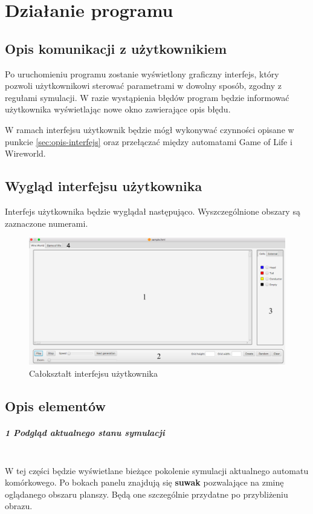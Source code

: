 \documentclass{report}
\begin{document}
\chapter{Działanie programu}

\section{Opis komunikacji z użytkownikiem}
Po uruchomieniu programu zostanie wyświetlony graficzny interfejs, który pozwoli użytkownikowi sterować parametrami w dowolny sposób, zgodny z regułami symulacji. W razie wystąpienia błędów program będzie informować użytkownika wyświetlając nowe okno zawierające opis błędu.

W ramach interfejsu użytkownik będzie mógł wykonywać czynności opisane w punkcie \ref{sec:opis-interfejs} oraz przełączać między automatami Game of Life i Wireworld.

\section{Wygląd interfejsu użytkownika}
Interfejs użytkownika będzie wyglądał następująco. Wyszczególnione obszary są zaznaczone numerami.
\begin{figure}[H]
    \centering
    \includegraphics[width=0.99\columnwidth]{gui.png} %
    \caption{Całokształt interfejsu użytkownika}
\end{figure}

\section{Opis elementów}
\paragraph{1 Podgląd aktualnego stanu symulacji} \mbox{} \\
W tej części będzie wyświetlane bieżące pokolenie symulacji aktualnego automatu komórkowego. Po bokach panelu znajdują się \textbf{suwak} pozwalające na zminę oglądanego obszaru planszy. Będą one szczególnie przydatne po przybliżeniu obrazu.
\end{document}
